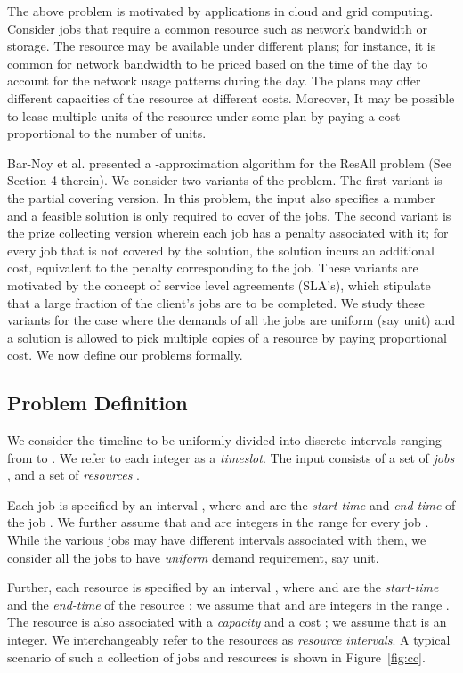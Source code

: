 \documentclass[11pt]{article}
\newcommand{\ResAll} {{\sc ResAll}}
\begin{document}
The above problem is motivated by applications in cloud and grid computing.
Consider jobs that require a common resource such as network bandwidth or storage.
The resource may be available under different plans; for instance, it is common for network bandwidth to be priced
based on the time of the day to account for the network usage patterns during the day. 
The plans may offer different capacities of the resource at different costs.
Moreover, It may be possible to lease multiple units of the resource under some plan by paying a cost
proportional to the number of units.

Bar-Noy et al. \cite{Bar-Noy} presented a -approximation algorithm for the {\ResAll} problem
(See Section 4 therein).
We consider two variants of the problem.
The first variant is the partial covering version. In this problem, the input also specifies a number  and
a feasible solution is only required to cover  of the jobs.
The second variant is the prize collecting version wherein each job has a penalty associated with it;
for every job that is not covered by the solution, the solution incurs an additional cost, 
equivalent to the penalty corresponding to the job.
These variants are motivated by the concept of service level agreements (SLA's), 
which stipulate that a large fraction of the client's jobs are to be completed. 
We study these variants for the case where the demands of all the jobs are uniform (say  unit)
and a solution is allowed to pick multiple copies of a resource by paying proportional cost.
We now define our problems formally.

\subsection{Problem Definition}
We consider the timeline  to be uniformly divided into discrete intervals ranging from  to .
We refer to each integer  as a {\it timeslot}.
The input consists of a set of  {\em jobs} , and a set of {\em resources} .

Each job  is specified by an interval , where  and  are the {\em start-time} and {\em end-time}
of the job . We further assume that  and  are integers in the range  for every job .
While the various jobs may have different intervals associated with them, we consider all the jobs to have
{\em uniform} demand requirement, say  unit. 

Further, each resource  is specified
by an interval , where  and  are the {\em start-time} and the {\em end-time}
of the resource ; we assume that  and  are integers in the range . 
The resource  is also associated with a {\em capacity}  and a cost ; we
assume that  is an integer. 
We interchangeably refer to the resources as {\em resource intervals}.
A typical scenario of such a collection of jobs and resources is shown in Figure~\ref{fig:cc}.
\end{document}
